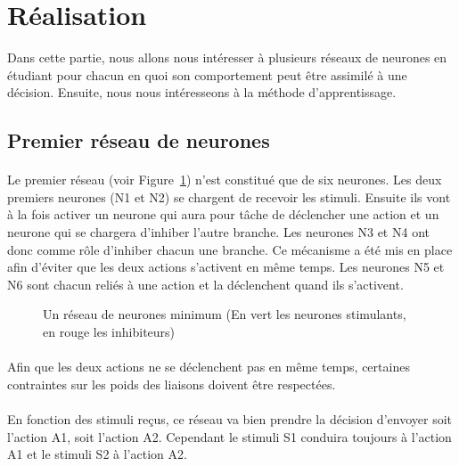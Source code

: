 \section{Réalisation}
Dans cette partie, nous allons nous intéresser à plusieurs réseaux de neurones
en étudiant pour chacun en quoi son comportement peut être assimilé à une
décision. Ensuite, nous nous intéresseons à la méthode d'apprentissage.


\subsection{Premier réseau de neurones}
\paragraph{}
Le premier réseau (voir Figure~\ref{reseau1}) n'est constitué que de six
neurones. Les deux premiers neurones (N1 et N2) se chargent de recevoir
les stimuli. Ensuite ils vont à la fois activer un neurone qui aura pour
tâche de déclencher une action et un neurone qui se chargera d'inhiber
l'autre branche. Les neurones N3 et N4 ont donc comme rôle d'inhiber chacun
une branche. Ce mécanisme a été mis en place afin d'éviter que les deux
actions s'activent en même temps. Les neurones N5 et N6 sont chacun reliés
à une action et la déclenchent quand ils s'activent.

\begin{figure}[!h]
  \begin{center}
    
  \end{center}
  \caption{Un réseau de neurones minimum (En vert les neurones stimulants, en rouge les inhibiteurs)}
  \label{reseau1}
\end{figure}

\paragraph{}
Afin que les deux actions ne se déclenchent pas en même temps, certaines
contraintes sur les poids des liaisons doivent être respectées.

\paragraph{}
En fonction des stimuli reçus, ce réseau va bien prendre la décision
d'envoyer soit l'action A1, soit l'action A2. Cependant le
stimuli S1 conduira toujours à l'action A1 et le stimuli S2 à
l'action A2.

